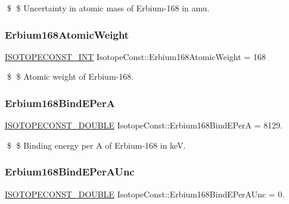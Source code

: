 \$ \$ Uncertainty in atomic mass of Erbium-\/168 in amu. \mbox{\label{group___isotope_const-_erbium-_er168_ga3008d3c58573950dd4e5c1f224ee0d87}} 
\subsubsection{\texorpdfstring{Erbium168\+Atomic\+Weight}{Erbium168AtomicWeight}}
{\footnotesize\ttfamily \mbox{\hyperlink{group___isotope_const-_macros_ga5f18360b3e99483a35c32d789e62621c}{I\+S\+O\+T\+O\+P\+E\+C\+O\+N\+S\+T\+\_\+\+I\+NT}} Isotope\+Const\+::\+Erbium168\+Atomic\+Weight = 168}

\$ \$ Atomic weight of Erbium-\/168. \mbox{\label{group___isotope_const-_erbium-_er168_ga1c39fa245152a5c83a30660c346246e5}} 
\subsubsection{\texorpdfstring{Erbium168\+Bind\+E\+PerA}{Erbium168BindEPerA}}
{\footnotesize\ttfamily \mbox{\hyperlink{group___isotope_const-_macros_ga8f45a7272ce02c0b4c65c44636ed719a}{I\+S\+O\+T\+O\+P\+E\+C\+O\+N\+S\+T\+\_\+\+D\+O\+U\+B\+LE}} Isotope\+Const\+::\+Erbium168\+Bind\+E\+PerA = 8129.}

\$ \$ Binding energy per A of Erbium-\/168 in keV. \mbox{\label{group___isotope_const-_erbium-_er168_ga0f6af5957fd398835fe641407f7eb10f}} 
\subsubsection{\texorpdfstring{Erbium168\+Bind\+E\+Per\+A\+Unc}{Erbium168BindEPerAUnc}}
{\footnotesize\ttfamily \mbox{\hyperlink{group___isotope_const-_macros_ga8f45a7272ce02c0b4c65c44636ed719a}{I\+S\+O\+T\+O\+P\+E\+C\+O\+N\+S\+T\+\_\+\+D\+O\+U\+B\+LE}} Isotope\+Const\+::\+Erbium168\+Bind\+E\+Per\+A\+Unc = 0.}

